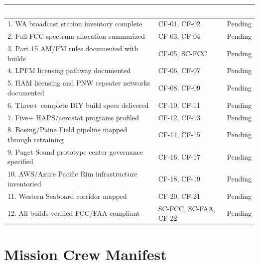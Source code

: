 \documentclass[11pt,letterpaper]{article}
\newcommand{\tableheader}[1]{\textbf{\sffamily\textcolor{white}{#1}}}
\begin{document}
\begin{center}
\begin{tabularx}{\textwidth}{XL{3.5cm}C{1.5cm}}
\toprule
{}
\tableheader{Success Criterion} & \tableheader{Test ID(s)} & \tableheader{Status} \\
. WA broadcast station inventory complete & CF-01, CF-02 & Pending \\
2. Full FCC spectrum allocation summarized & CF-03, CF-04 & Pending \\
3. Part 15 AM/FM rules documented with builds & CF-05, SC-FCC & Pending \\
4. LPFM licensing pathway documented & CF-06, CF-07 & Pending \\
5. HAM licensing and PNW repeater networks documented & CF-08, CF-09 & Pending \\
6. Three+ complete DIY build specs delivered & CF-10, CF-11 & Pending \\
7. Five+ HAPS/aerostat programs profiled & CF-12, CF-13 & Pending \\
8. Boeing/Paine Field pipeline mapped through retraining & CF-14, CF-15 & Pending \\
9. Puget Sound prototype center governance specified & CF-16, CF-17 & Pending \\
10. AWS/Azure Pacific Rim infrastructure inventoried & CF-18, CF-19 & Pending \\
11. Western Seaboard corridor mapped & CF-20, CF-21 & Pending \\
12. All builds verified FCC/FAA compliant & SC-FCC, SC-FAA, CF-22 & Pending \\
\bottomrule
\end{tabularx}
\end{center}

\section{Mission Crew Manifest}
\end{document}
